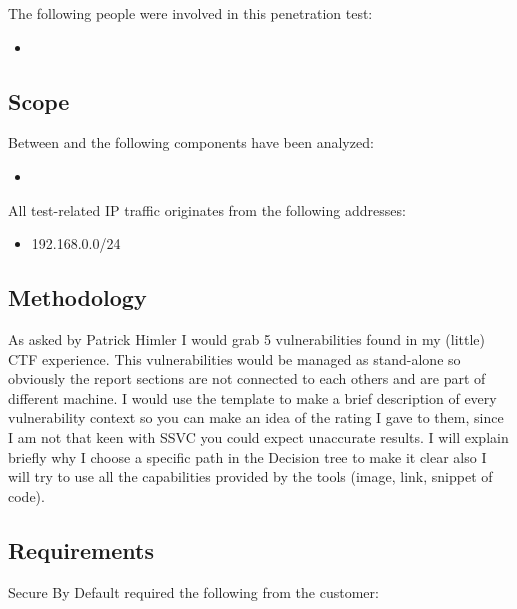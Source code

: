 The following people were involved in this penetration test:

\begin{itemize}
    \item {}
\end{itemize}

\subsection{Scope}

Between  and  the following components have been analyzed:

\begin{itemize}
    \item {}
\end{itemize}

All test-related IP traffic originates from the following addresses:

\begin{itemize}
  \item \passthrough{192.168.0.0/24}
\end{itemize}

\subsection{Methodology}

As asked by Patrick Himler I would grab 5 vulnerabilities found in my (little) CTF experience. This
vulnerabilities would be managed as stand-alone so obviously the report sections are not connected to
each others and are part of different machine. I would use the template to make a brief description of every vulnerability context so you can make an idea of the rating I gave to them, since I am not that keen with SSVC you could expect unaccurate results. I will explain briefly why I choose a specific path in the Decision tree to make it clear also I will try to use all the capabilities provided by the tools (image, link, snippet of code).

  \subsection{Requirements}

  Secure By Default required the following from the customer:

